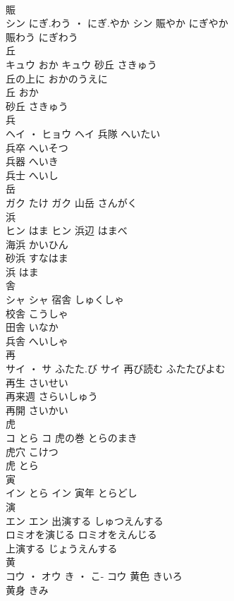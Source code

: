 \documentclass[8pt]{extreport}
\begin{document}
\begin{CJK}{UTF8}{min}
\\	賑	
\\	シン	にぎ.わう ・ にぎ.やか	シン	賑やか	にぎやか	
\\	賑わう	にぎわう	
\\	丘	
\\	キュウ	おか	キュウ	砂丘	さきゅう	
\\	丘の上に	おかのうえに	
\\	丘	おか	
\\	砂丘	さきゅう	
\\	兵	
\\	ヘイ ・ ヒョウ		ヘイ	兵隊	へいたい	
\\	兵卒	へいそつ	
\\	兵器	へいき	
\\	兵士	へいし	
\\	岳	
\\	ガク	たけ	ガク													山岳	さんがく	
\\	浜	
\\	ヒン	はま	ヒン	浜辺	はまべ	
\\	海浜	かいひん	
\\	砂浜	すなはま	
\\	浜	はま	
\\	舎	
\\	シャ		シャ	宿舎	しゅくしゃ	
\\	校舎	こうしゃ	
\\	田舎	いなか	
\\	兵舎	へいしゃ	
\\	再	
\\	サイ ・ サ	ふたた.び	サイ	再び読む	ふたたびよむ	
\\	再生	さいせい	
\\	再来週	さらいしゅう	
\\	再開	さいかい	
\\	虎	
\\	コ	とら	コ	虎の巻	とらのまき	
\\	虎穴	こけつ	
\\	虎	とら	
\\	寅	
\\	イン	とら	イン	寅年	とらどし	
\\	演	
\\	エン		エン	出演する	しゅつえんする	
\\	ロミオを演じる	ロミオをえんじる	
\\	上演する	じょうえんする	
\\	黄	
\\	コウ ・ オウ	き ・ こ-	コウ	黄色	きいろ	
\\	黄身	きみ	

\end{CJK}
\end{document}
